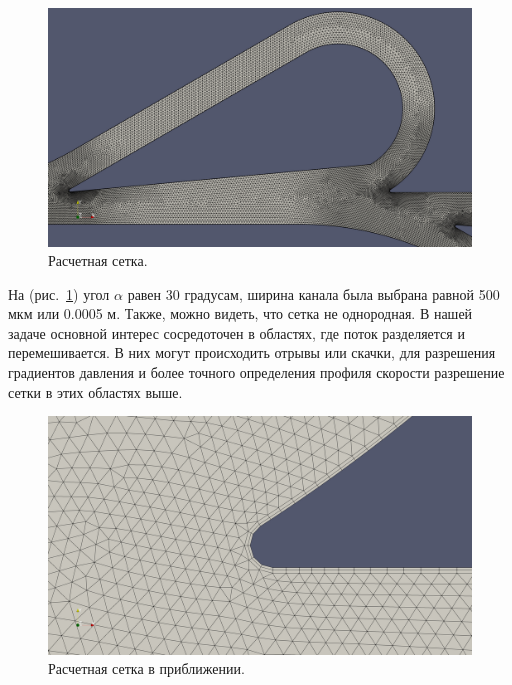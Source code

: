 \documentclass[14pt,a4paper]{article}
\begin{document}
        
        \begin{figure}[h!]
            \centering
            \includegraphics[width = 1\linewidth]{teslaMesh1}
            \caption{Расчетная сетка.}
            \label{fig:teslaMesh}
        \end{figure}
        
        На (рис.~\ref{fig:teslaMesh}) угол $\alpha$ равен 30 градусам, ширина канала была выбрана равной 500 мкм или 0.0005 м. Также, можно видеть, что сетка не однородная. В нашей задаче основной интерес сосредоточен в областях, где поток разделяется и перемешивается. В них могут происходить отрывы или скачки, для разрешения градиентов давления и более точного определения профиля скорости разрешение сетки в этих областях выше.
        
        \begin{figure}[H]
            \centering
            \includegraphics[width = 1\linewidth]{teslaMesh2}
            \caption{Расчетная сетка в приближении.}
            \label{fig:teslaMesh2}
        \end{figure}   
             
\end{document}
